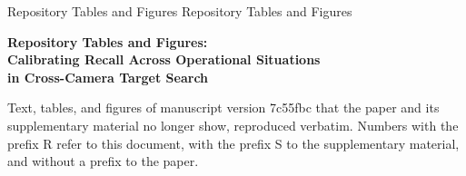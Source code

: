 \documentclass{ieeeaccess}
\begin{document}
\markboth
{Repository Tables and Figures}
{Repository Tables and Figures}
\onecolumn
\begin{center}
{\LARGE\bfseries Repository Tables and Figures:\\ Calibrating Recall Across Operational Situations\\ in Cross-Camera Target Search\par}
\vspace{1ex}
{\normalsize Text, tables, and figures of manuscript version 7c55fbc that the paper and its supplementary material
no longer show, reproduced verbatim. Numbers with the prefix R refer to this document, with the prefix S to the
supplementary material, and without a prefix to the paper.\par}
\end{center}
\suppressfloats[t]


\clearpage





\EOD
\end{document}
